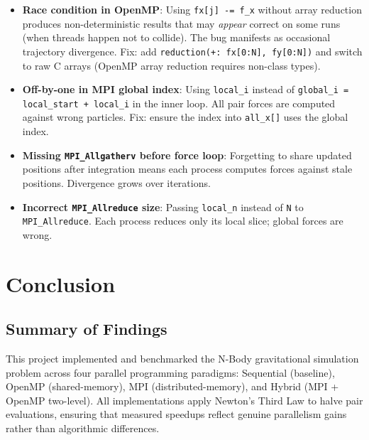 ﻿\documentclass[12pt,a4paper]{article}
\begin{document}
\begin{itemize}
    \item \textbf{Race condition in OpenMP}: Using \texttt{fx[j] -= f\_x}
          without array reduction produces non-deterministic results that may
          \emph{appear} correct on some runs (when threads happen not to
          collide). The bug manifests as occasional trajectory divergence.
          Fix: add \texttt{reduction(+: fx[0:N], fy[0:N])} and switch to
          raw C arrays (OpenMP array reduction requires non-class types).
    \item \textbf{Off-by-one in MPI global index}: Using \texttt{local\_i}
          instead of \texttt{global\_i = local\_start + local\_i} in the
          inner loop. All pair forces are computed against wrong particles.
          Fix: ensure the index into \texttt{all\_x[]} uses the global index.
    \item \textbf{Missing \texttt{MPI\_Allgatherv} before force loop}:
          Forgetting to share updated positions after integration means each
          process computes forces against stale positions. Divergence grows
          over iterations.
    \item \textbf{Incorrect \texttt{MPI\_Allreduce} size}: Passing
          \texttt{local\_n} instead of \texttt{N} to \texttt{MPI\_Allreduce}.
          Each process reduces only its local slice; global forces are wrong.
\end{itemize}

\section{Conclusion}

\subsection{Summary of Findings}

This project implemented and benchmarked the N-Body gravitational simulation
problem across four parallel programming paradigms: Sequential (baseline),
OpenMP (shared-memory), MPI (distributed-memory), and Hybrid (MPI + OpenMP
two-level). All implementations apply Newton's Third Law to halve pair
evaluations, ensuring that measured speedups reflect genuine parallelism
gains rather than algorithmic differences.
\end{document}
